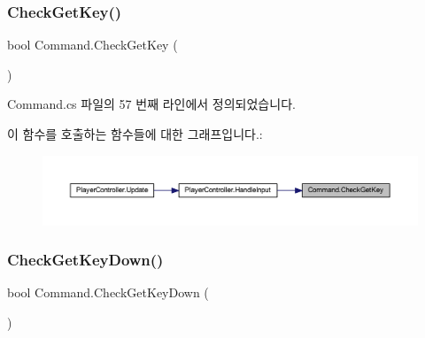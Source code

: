 \subsubsection{\texorpdfstring{CheckGetKey()}{CheckGetKey()}}
{\footnotesize\ttfamily bool Command.\+Check\+Get\+Key (\begin{DoxyParamCaption}{ }\end{DoxyParamCaption})}



Command.\+cs 파일의 57 번째 라인에서 정의되었습니다.


\begin{DoxyCode}{0}

\end{DoxyCode}
이 함수를 호출하는 함수들에 대한 그래프입니다.\+:
\nopagebreak
\begin{figure}[H]
\begin{center}
\leavevmode
\includegraphics[width=350pt]{d5/d6a/class_command_aae2d7670c9ee25e629d3702579416095_icgraph}
\end{center}
\end{figure}
\mbox{\label{class_command_ac35514f10fbf789814e9ce5431a26562}} 
\subsubsection{\texorpdfstring{CheckGetKeyDown()}{CheckGetKeyDown()}}
{\footnotesize\ttfamily bool Command.\+Check\+Get\+Key\+Down (\begin{DoxyParamCaption}{ }\end{DoxyParamCaption})}



